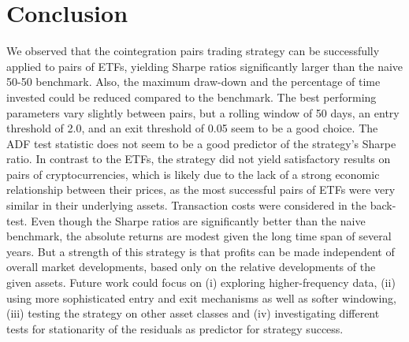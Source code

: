 \documentclass{article}
\begin{document}
\section{Conclusion}
We observed that the cointegration pairs trading strategy can be successfully applied to pairs of ETFs, yielding Sharpe ratios significantly larger than the naive 50-50 benchmark. Also, the maximum draw-down and the percentage of time invested could be reduced compared to the benchmark. The best performing parameters vary slightly between pairs, but a rolling window of 50 days, an entry threshold of 2.0, and an exit threshold of 0.05 seem to be a good choice. The ADF test statistic does not seem to be a good predictor of the strategy's Sharpe ratio.
In contrast to the ETFs, the strategy did not yield satisfactory results on pairs of cryptocurrencies, which is likely due to the lack of a strong economic relationship between their prices, as the most successful pairs of ETFs were very similar in their underlying assets.
Transaction costs were considered in the back-test. \newline
Even though the Sharpe ratios are significantly better than the naive benchmark, the absolute returns are modest given the long time span of several years. But a strength of this strategy is that profits can be made independent of overall market developments, based only on the relative developments of the given assets.\newline
Future work could focus on (i) exploring higher-frequency data, (ii) using more sophisticated entry and exit mechanisms as well as softer windowing, (iii) testing the strategy on other asset classes and (iv) investigating different tests for stationarity of the residuals as predictor for strategy success.
\newpage

\appendix
\end{document}
